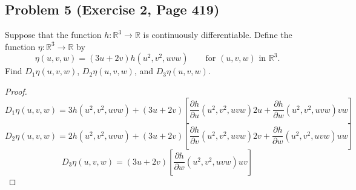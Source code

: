 \documentclass{article}
\begin{document}
\subsection*{Problem 5 (Exercise 2, Page 419)}
Suppose that the function $h \colon \mathbb{R}^3 \to \mathbb{R}$ is continuously differentiable. Define the function $\eta \colon \mathbb{R}^3 \to \mathbb{R}$ by
\[ \eta(u, v, w) = (3u + 2v)h(u^2, v^2, uvw) \qquad \text{for $(u, v, w)$ in $\mathbb{R}^3$}.\]
Find $D_1\eta(u, v, w)$, $D_2\eta(u, v, w)$, and $D_3\eta(u, v, w)$.
\begin{proof}
\[ D_1\eta(u, v, w) = 3h(u^2, v^2, uvw) + (3u+2v)\left[\frac{\partial h}{\partial u}(u^2, v^2, uvw)2u + \frac{\partial h}{\partial w}(u^2, v^2, uvw)vw\right]\]
\[ D_2\eta(u, v, w) = 2h(u^2, v^2, uvw) + (3u+2v)\left[\frac{\partial h}{\partial v}(u^2, v^2, uvw)2v + \frac{\partial h}{\partial w}(u^2, v^2, uvw)uw\right]\]
\[ D_3\eta(u, v, w) = (3u + 2v)\left[\frac{\partial h}{\partial w}(u^2, v^2, uvw)uv \right]\]
\end{proof}
\end{document}
